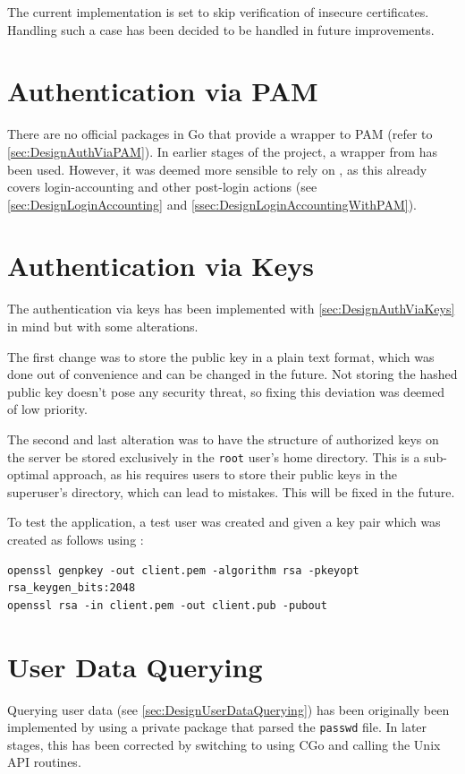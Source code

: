 \documentclass[10pt,a4paper,titlepage,twoside,english,final]{zhawreprt}
\begin{document}
The current implementation is set to skip verification of insecure certificates.
Handling such a case has been decided to be handled in future improvements.

\section{Authentication via PAM}\label{sec:ImplAuthViaPAM}
There are no official packages in \gls{Go} that provide a wrapper to \gls{PAM} (refer to \ref{sec:DesignAuthViaPAM}).
In earlier stages of the project, a wrapper from \cite{gopam} has been used.
However, it was deemed more sensible to rely on \cite{login}, as this already covers login-accounting and other post-login actions (see \ref{sec:DesignLoginAccounting} and \ref{ssec:DesignLoginAccountingWithPAM}).

\section{Authentication via Keys}\label{sec:ImplAuthViaKeys}
The authentication via keys has been implemented with \ref{sec:DesignAuthViaKeys} in mind but with some alterations.

The first change was to store the public key in a plain text format, which was done out of convenience and can be changed in the future.
Not storing the hashed public key doesn't pose any security threat, so fixing this deviation was deemed of low priority.

The second and last alteration was to have the structure of authorized keys on the server be stored exclusively in the \texttt{root} user's home directory.
This is a sub-optimal approach, as his requires users to store their public keys in the superuser's directory, which can lead to mistakes.
This will be fixed in the future.

To test the application, a test user was created and given a key pair which was created as follows using \cite{openssl}:
\setlistingBash
\begin{lstlisting}[caption={Generating a key pair for the client},label=lst:GenClientKeyPair]
openssl genpkey -out client.pem -algorithm rsa -pkeyopt rsa_keygen_bits:2048
openssl rsa -in client.pem -out client.pub -pubout
\end{lstlisting}

\section{User Data Querying}\label{sec:ImplUserDataQuerying}
Querying user data (see \ref{sec:DesignUserDataQuerying}) has been originally been implemented by using a private package that parsed the \texttt{passwd} file.
In later stages, this has been corrected by switching to using \gls{CGo} and calling the \gls{Unix} \gls{API} routines.
\end{document}
